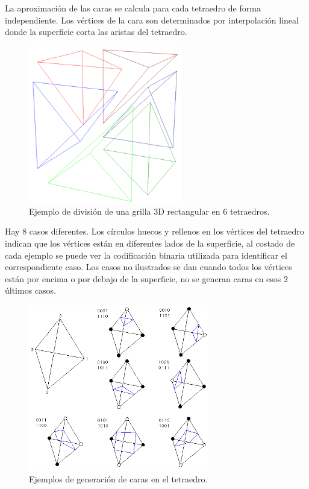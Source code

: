\documentclass[12pt]{article}
\begin{document}
La aproximación de las caras se calcula para cada tetraedro de forma independiente. Los vértices de la cara son determinados por interpolación lineal donde la superficie corta las aristas del tetraedro.
\begin{figure}[h!]
\includegraphics[width=0.6\textwidth,center]{mt1.png}
\caption{Ejemplo de división de una grilla 3D rectangular en 6 tetraedros.}
\label{6tet}
\end{figure}
\clearpage
Hay 8 casos diferentes. Los círculos huecos y rellenos en los vértices del tetraedro indican que los vértices están en diferentes lados de la superficie, al costado de cada ejemplo se puede ver la codificación binaria utilizada para identificar el correspondiente caso. Los casos no ilustrados se dan cuando todos los vértices están por encima o por debajo de la superficie, no se generan caras en esos 2 últimos casos.
\begin{figure}[h!]
\includegraphics[width=0.7\textwidth,center]{mt2.png}
\caption{Ejemplos de generación de caras en el tetraedro.}
\label{tet}
\end{figure}\\
\end{document}
